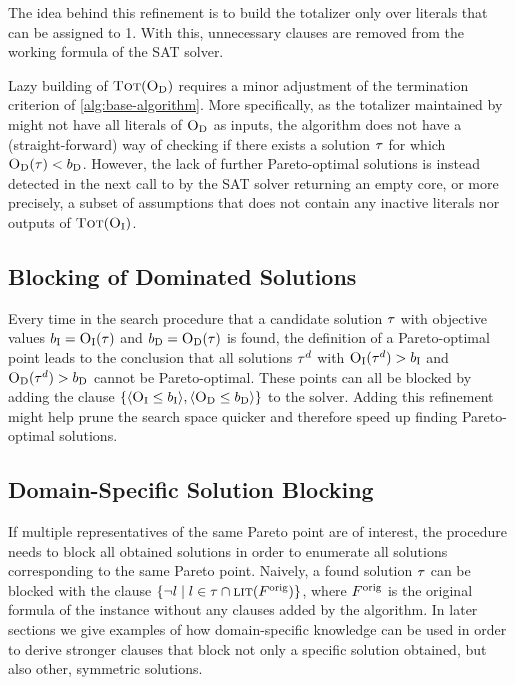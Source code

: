 The idea behind this refinement is to build the totalizer only over literals that can be assigned to 1.
With this, unnecessary clauses are removed from the working formula of the SAT solver.

Lazy building of $\textsc{Tot}(\textsc{O}_{\text{D}})$ requires a minor adjustment of the termination criterion of \cref{alg:base-algorithm}.
More specifically, as the totalizer maintained by \Simpr{} might not have all literals of $\textsc{O}_{\text{D}}$ as inputs, the algorithm does not have a (straight-forward) way of checking if there exists a solution $\tau$ for which $\textsc{O}_{\text{D}}(\tau) < b_{\text{D}}$.
However, the lack of further Pareto-optimal solutions is instead detected in the next call to \Min{} by the SAT solver returning an empty core, or more precisely, a subset of assumptions that does not contain any inactive literals nor outputs of $\textsc{Tot}(\textsc{O}_{\text{I}})$.

\subsection{Blocking of Dominated Solutions}

Every time in the search procedure that a candidate solution $\tau$ with objective values $b_{\text{I}} = \textsc{O}_{\text{I}}(\tau)$ and $b_{\text{D}} = \textsc{O}_{\text{D}}(\tau)$ is found, the definition of a Pareto-optimal point leads to the conclusion that all solutions $\tau^d$ with $\textsc{O}_{\text{I}}(\tau^d) > b_{\text{I}}$ and $\textsc{O}_{\text{D}}(\tau^d) > b_{\text{D}}$ cannot be Pareto-optimal.
These points can all be blocked by adding the clause $\{ \langle \textsc{O}_{\text{I}} \leq b_{\text{I}} \rangle, \langle \textsc{O}_{\text{D}} \leq b_{\text{D}} \rangle \}$ to the solver.
Adding this refinement might help prune the search space quicker and therefore speed up finding Pareto-optimal solutions.

\subsection{Domain-Specific Solution Blocking}

If multiple representatives of the same Pareto point are of interest, the procedure \E{} needs to block all obtained solutions in order to enumerate all solutions corresponding to the same Pareto point. 
Naively, a found solution $\tau$ can be blocked with the clause $\{ \lnot l \mid l \in \tau \cap \textsc{lit}(F^\text{orig}) \}$, where $F^\text{orig}$ is the original formula of the instance without any clauses added by the algorithm.
In later sections we give examples of how domain-specific knowledge can be used in order to derive stronger clauses that block not only a specific solution obtained, but also other, symmetric solutions.


